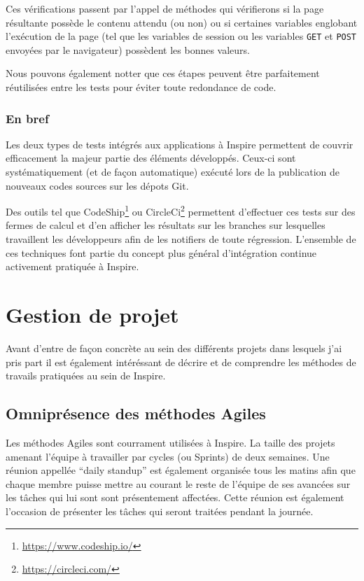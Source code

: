 \documentclass[12pt,a4paper]{book}
\begin{document}
Ces vérifications passent par l'appel de méthodes qui vérifierons si la page résultante possède le contenu attendu (ou non) ou si certaines variables englobant l'exécution de la page (tel que les variables de session ou les variables \texttt{GET} et \texttt{POST} envoyées par le navigateur) possèdent les bonnes valeurs.

Nous pouvons également notter que ces étapes peuvent être parfaitement réutilisées entre les tests pour éviter toute redondance de code.

\subsubsection{En bref}

Les deux types de tests intégrés aux applications à Inspire permettent de couvrir efficacement la majeur partie des éléments développés. Ceux-ci sont systématiquement (et de façon automatique) exécuté lors de la publication de nouveaux codes sources sur les dépots Git.

Des outils tel que CodeShip\footnote{\url{https://www.codeship.io/}} ou CircleCi\footnote{\url{https://circleci.com/}} permettent d'effectuer ces tests sur des fermes de calcul et d'en afficher les résultats sur les branches sur lesquelles travaillent les développeurs afin de les notifiers de toute régression. L'ensemble de ces techniques font partie du concept plus général d'intégration continue activement pratiquée à Inspire.

\section{Gestion de projet}

Avant d'entre de façon concrète au sein des différents projets dans lesquels j'ai pris part il est également intéréssant de décrire et de comprendre les méthodes de travails pratiquées au sein de Inspire.

\subsection{Omniprésence des méthodes Agiles}

Les méthodes Agiles sont courrament utilisées à Inspire. La taille des projets amenant l'équipe à travailler par cycles (ou Sprints) de deux semaines. Une réunion appellée ``daily standup'' est également organisée tous les matins afin que chaque membre puisse mettre au courant le reste de l'équipe de ses avancées sur les tâches qui lui sont sont présentement affectées. Cette réunion est également l'occasion de présenter les tâches qui seront traitées pendant la journée.
\end{document}
